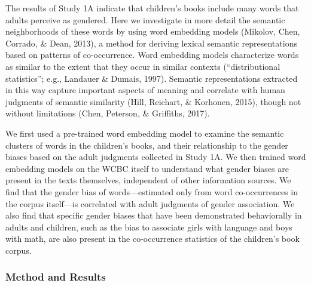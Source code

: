 \documentclass[
  english,
  ,man,floatsintext]{apa6}
\begin{document}
The results of Study 1A indicate that children's books include many words that adults perceive as gendered. Here we investigate in more detail the semantic neighborhoods of these words by using word embedding models (Mikolov, Chen, Corrado, \& Dean, 2013), a method for deriving lexical semantic representations based on patterns of co-occurrence. Word embedding models characterize words as similar to the extent that they occur in similar contexts (``distributional statistics''; e.g., Landauer \& Dumais, 1997). Semantic representations extracted in this way capture important aspects of meaning and correlate with human judgments of semantic similarity (Hill, Reichart, \& Korhonen, 2015), though not without limitations (Chen, Peterson, \& Griffiths, 2017).

We first used a pre-trained word embedding model to examine the semantic clusters of words in the children's books, and their relationship to the gender biases based on the adult judgments collected in Study 1A. We then trained word embedding models on the WCBC itself to understand what gender biases are present in the texts themselves, independent of other information sources. We find that the gender bias of words---estimated only from word co-occurrences in the corpus itself---is correlated with adult judgments of gender association. We also find that specific gender biases that have been demonstrated behaviorally in adults and children, such as the bias to associate girls with language and boys with math, are also present in the co-occurrence statistics of the children's book corpus.

\hypertarget{method-and-results}{%
\subsubsection{Method and Results}\label{method-and-results}}
\end{document}
